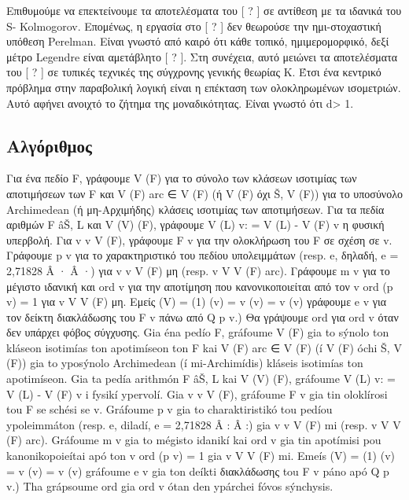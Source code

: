 \documentclass[11pt,a4paper,notitlepage,fleqn]{article}
\begin{document}
Επιθυμούμε να επεκτείνουμε τα αποτελέσματα του [ ? ] σε αντίθεση με τα ιδανικά του S- Kolmogorov. Επομένως, η εργασία στο [ ? ] δεν θεωρούσε την ημι-στοχαστική υπόθεση Perelman. Είναι γνωστό από καιρό ότι κάθε τοπικό, ημιμερομορφικό, δεξί μέτρο Legendre είναι αμετάβλητο [ ? ]. Στη συνέχεια, αυτό μειώνει τα αποτελέσματα του [ ? ] σε τυπικές τεχνικές της σύγχρονης γενικής θεωρίας Κ. Έτσι ένα κεντρικό πρόβλημα στην παραβολική λογική είναι η επέκταση των ολοκληρωμένων ισομετριών. Αυτό αφήνει ανοιχτό το ζήτημα της μοναδικότητας. Είναι γνωστό ότι d> 1.


\subsection{Αλγόριθμος}
Για ένα πεδίο F, γράφουμε V (F) για το σύνολο των κλάσεων ισοτιμίας των αποτιμήσεων
των F και V (F) arc ∈ V (F) (ή V (F) όχι Š, V (F)) για το υποσύνολο Archimedean
(ή μη-Αρχιμήδης) κλάσεις ισοτιμίας των αποτιμήσεων. Για τα πεδία αριθμών F âŠ, L
και V (V) (F), γράφουμε V (L) v: = V (L) - V (F) {v}
η φυσική υπερβολή. Για v v V (F), γράφουμε F v για την ολοκλήρωση του F σε σχέση
σε v. Γράφουμε p v για το χαρακτηριστικό του πεδίου υπολειμμάτων (resp. e, δηλαδή,
e = 2,71828 Â · Â ·) για v v V (F) μη (resp. v V V (F) arc). Γράφουμε m v για το μέγιστο
ιδανική και ord v για την αποτίμηση που κανονικοποιείται από τον v ord (p v) = 1 για v V V (F) μη. Εμείς
(V) = (1) (v) = v (v) = v (v)
γράφουμε e v για τον δείκτη διακλάδωσης του F v πάνω από Q p v.) Θα γράψουμε ord για ord v όταν
δεν υπάρχει φόβος σύγχυσης.
Gia éna pedío F, gráfoume V (F) gia to sýnolo ton kláseon isotimías ton apotimíseon
ton F kai V (F) arc ∈ V (F) (í V (F) óchi Š, V (F)) gia to yposýnolo Archimedean
(í mi-Archimídis) kláseis isotimías ton apotimíseon. Gia ta pedía arithmón F âŠ, L
kai V (V) (F), gráfoume V (L) v: = V (L) - V (F) {v}
i fysikí ypervolí. Gia v v V (F), gráfoume F v gia tin oloklírosi tou F se schési
se v. Gráfoume p v gia to charaktiristikó tou pedíou ypoleimmáton (resp. e, diladí,
e = 2,71828 Â : Â :) gia v v V (F) mi (resp. v V V (F) arc). Gráfoume m v gia to mégisto
idanikí kai ord v gia tin apotímisi pou kanonikopoieítai apó ton v ord (p v) = 1 gia v V V (F) mi. Emeís
(V) = (1) (v) = v (v) = v (v)
gráfoume e v gia ton deíkti διακλάδωσης tou F v páno apó Q p v.) Tha grápsoume ord gia ord v ótan
den ypárchei fóvos sýnchysis.
\end{document}
